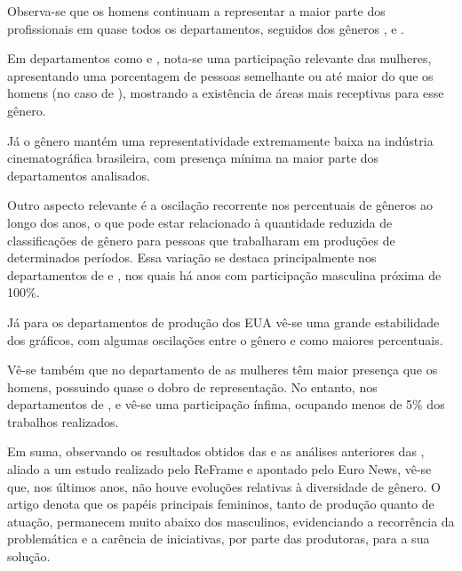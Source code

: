 %

Observa-se que os homens continuam a representar a maior parte dos profissionais em quase todos os departamentos, seguidos dos gêneros ,  e .

Em departamentos como  e , nota-se uma participação relevante das mulheres, apresentando uma porcentagem de pessoas semelhante ou até maior do que os homens (no caso de ), mostrando a existência de áreas mais receptivas para esse gênero.

Já o gênero  mantém uma representatividade extremamente baixa na indústria cinematográfica brasileira, com presença mínima na maior parte dos departamentos analisados.

Outro aspecto relevante é a oscilação recorrente nos percentuais de gêneros ao longo dos anos, o que pode estar relacionado à quantidade reduzida de classificações de gênero para pessoas que trabalharam em produções de determinados períodos. Essa variação se destaca principalmente nos departamentos de  e , nos quais há anos com participação masculina próxima de 100\%.

%

Já para os departamentos de produção dos EUA vê-se uma grande estabilidade dos gráficos, com algumas oscilações entre o gênero  e  como maiores percentuais.

Vê-se também que no departamento de  as mulheres têm maior presença que os homens, possuindo quase o dobro de representação. No entanto, nos departamentos de ,  e  vê-se uma participação ínfima, ocupando menos de 5\% dos trabalhos realizados.

Em suma, observando os resultados obtidos das  e as análises anteriores das , aliado a um estudo realizado pelo ReFrame e apontado pelo Euro News\cite{euronews2024oscars}, vê-se que, nos últimos anos, não houve evoluções relativas à diversidade de gênero. O artigo denota que os papéis principais femininos, tanto de produção quanto de atuação, permanecem muito abaixo dos masculinos, evidenciando a recorrência da problemática e a carência de iniciativas, por parte das produtoras, para a sua solução.

